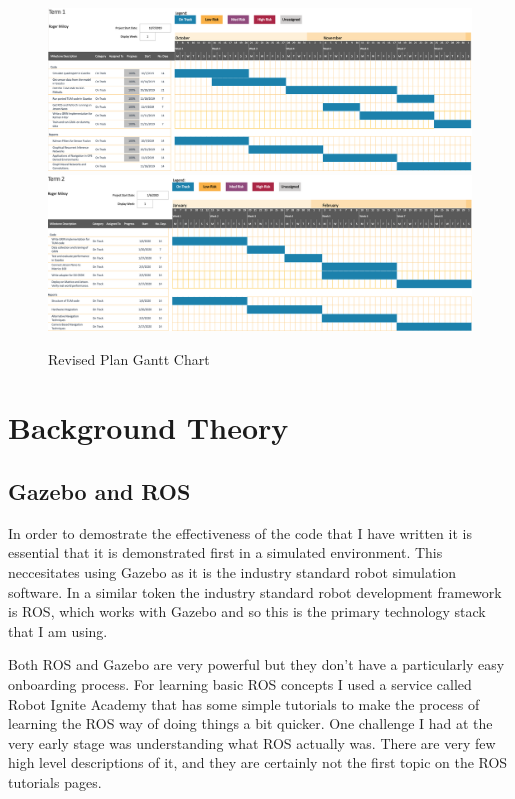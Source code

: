 \documentclass[]{../resources/final_report}
\begin{document}
\begin{figure}[h]
  \centering
  \includegraphics[width=\textwidth]{Term1GanttChart.png}
  \includegraphics[width=\textwidth]{Term2GanttChart.png}
  \caption{Revised Plan Gantt Chart}
  \label{}
\end{figure}

\chapter{Background Theory}

\section{Gazebo and ROS}

In order to demostrate the effectiveness of the code that I have written it is essential that it is 
demonstrated first in a simulated environment. This neccesitates using Gazebo as it is the industry 
standard robot simulation software. In a similar token the industry standard robot development 
framework is ROS, which works with Gazebo and so this is the primary technology stack that I am 
using.

Both ROS and Gazebo are very powerful but they don't have a particularly easy onboarding process. 
For learning basic ROS concepts I used a service called Robot Ignite Academy that has some simple 
tutorials to make the process of learning the ROS way of doing things a bit quicker. One challenge I 
had at the very early stage was understanding what ROS actually was. There are very few high level 
descriptions of it, and they are certainly not the first topic on the ROS tutorials pages.
\end{document}
